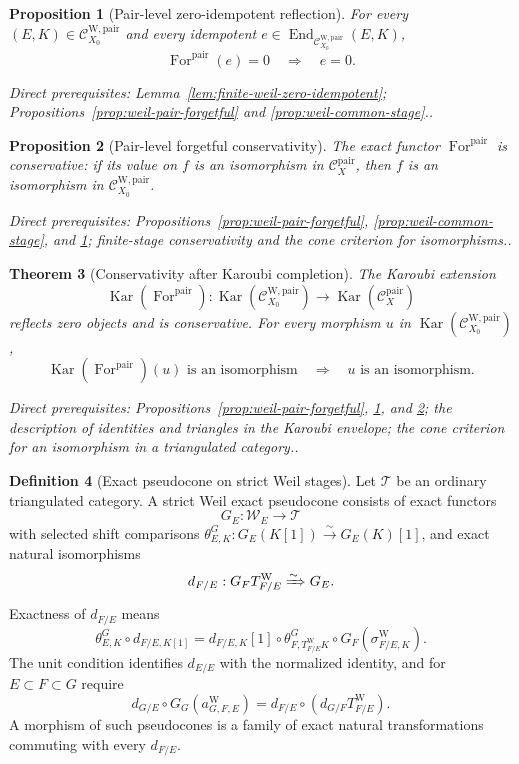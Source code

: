 \documentclass[10pt]{article}
\newtheorem{theorem}{Theorem}[section]
\newtheorem{proposition}[theorem]{Proposition}
\theoremstyle{definition}
\newtheorem{definition}[theorem]{Definition}
\newcommand{\End}{\operatorname{End}}
\newcommand{\Kar}{\operatorname{Kar}}
\newcommand{\Pair}{\mathcal C_X^{\mathrm{pair}}}
\newcommand{\PairW}{\mathcal C_{X_0}^{\mathrm{W,pair}}}
\newcommand{\depends}[1]{\par\smallskip\noindent\textit{Direct prerequisites:} #1.}
\begin{document}
\begin{proposition}[Pair-level zero-idempotent reflection]
\label{prop:zero-idempotent-reflection}
For every $(E,K)\in\PairW$ and every idempotent
$e\in\End_{\PairW}(E,K)$,
\[
 \operatorname{For}^{\mathrm{pair}}(e)=0
\quad\Longrightarrow\quad e=0.
\]
\depends{Lemma~\ref{lem:finite-weil-zero-idempotent};
Propositions~\ref{prop:weil-pair-forgetful} and
\ref{prop:weil-common-stage}.}
\end{proposition}

\begin{proposition}[Pair-level forgetful conservativity]
\label{prop:weil-pair-conservative}
The exact functor $\operatorname{For}^{\mathrm{pair}}$ is conservative:
if its value on $f$ is an isomorphism in $\Pair$, then $f$ is an
isomorphism in $\PairW$.
\depends{Propositions~\ref{prop:weil-pair-forgetful},
\ref{prop:weil-common-stage}, and \ref{prop:zero-idempotent-reflection};
finite-stage conservativity and the cone criterion for isomorphisms.}
\end{proposition}

\begin{theorem}[Conservativity after Karoubi completion]
\label{thm:weil-karoubi-conservative}
The Karoubi extension
\[
 \Kar(\operatorname{For}^{\mathrm{pair}}):
 \Kar(\PairW)\longrightarrow\Kar(\Pair)
\]
reflects zero objects and is conservative.  For every morphism $u$ in
$\Kar(\PairW)$,
\[
 \Kar(\operatorname{For}^{\mathrm{pair}})(u)\text{ is an isomorphism}
 \quad\Longrightarrow\quad u\text{ is an isomorphism}.
\]
\depends{Propositions~\ref{prop:weil-pair-forgetful},
\ref{prop:zero-idempotent-reflection}, and
\ref{prop:weil-pair-conservative}; the description of
identities and triangles in the Karoubi envelope; the cone criterion for an
isomorphism in a triangulated category.}
\end{theorem}

\begin{definition}[Exact pseudocone on strict Weil stages]
\label{def:weil-pseudocone}
Let $\mathcal T$ be an ordinary triangulated category.  A strict Weil exact
pseudocone consists of exact functors
\[
 G_E:\mathcal W_E\longrightarrow\mathcal T
\]
with selected shift comparisons
$\theta^G_{E,K}:G_E(K[1])\xrightarrow{\sim}G_E(K)[1]$, and exact natural
isomorphisms
\[
 d_{F/E}:G_FT^{\mathrm W}_{F/E}\xRightarrow{\sim}G_E.
\]
Exactness of $d_{F/E}$ means
\[
 \theta^G_{E,K}\circ d_{F/E,K[1]}
 =d_{F/E,K}[1]\circ\theta^G_{F,T^{\mathrm W}_{F/E}K}
  \circ G_F(\sigma^{\mathrm W}_{F/E,K}).
\]
The unit condition identifies $d_{E/E}$ with the normalized identity, and
for $E\subset F\subset G$ require
\[
 d_{G/E}\circ G_G(a^{\mathrm W}_{G,F,E})
 =d_{F/E}\circ(d_{G/F}T^{\mathrm W}_{F/E}).
\]
A morphism of such pseudocones is a family of exact natural transformations
commuting with every $d_{F/E}$.
\end{definition}
\end{document}
